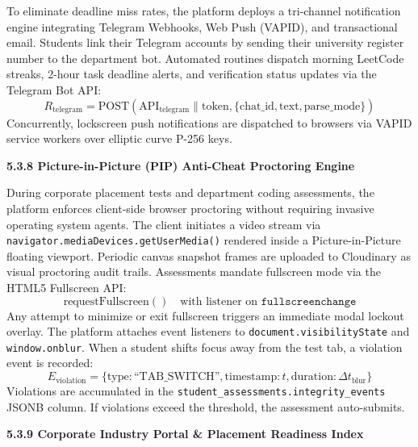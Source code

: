 {To eliminate deadline miss rates, the platform deploys a tri-channel notification engine integrating Telegram Webhooks, Web Push (VAPID), and transactional email.
Students link their Telegram accounts by sending their university register number to the department bot. Automated routines dispatch morning LeetCode streaks, 2-hour task deadline alerts, and verification status updates via the Telegram Bot API:
\begin{equation}
R_{\text{telegram}} = \text{POST}(\text{API}_{\text{telegram}} \parallel \text{token}, \{\text{chat\_id}, \text{text}, \text{parse\_mode}\}) \tag{9}
\end{equation}
Concurrently, lockscreen push notifications are dispatched to browsers via VAPID service workers over elliptic curve P-256 keys.

\vspace{0.4cm}
{\fontsize{13pt}{17pt}\selectfont\bfseries 5.3.8 Picture-in-Picture (PIP) Anti-Cheat Proctoring Engine\par}
\vspace{0.2cm}

During corporate placement tests and department coding assessments, the platform enforces client-side browser proctoring without requiring invasive operating system agents.
The client initiates a video stream via \texttt{navigator.mediaDevices.getUserMedia()} rendered inside a Picture-in-Picture floating viewport. Periodic canvas snapshot frames are uploaded to Cloudinary as visual proctoring audit trails.
Assessments mandate fullscreen mode via the HTML5 Fullscreen API:
\begin{equation}
\text{requestFullscreen}() \quad \text{with listener on } \texttt{fullscreenchange} \tag{10}
\end{equation}
Any attempt to minimize or exit fullscreen triggers an immediate modal lockout overlay. The platform attaches event listeners to \texttt{document.visibilityState} and \texttt{window.onblur}. When a student shifts focus away from the test tab, a violation event is recorded:
\begin{equation}
E_{\text{violation}} = \{\text{type}: \text{``TAB\_SWITCH''}, \text{timestamp}: t, \text{duration}: \Delta t_{\text{blur}}\} \tag{11}
\end{equation}
Violations are accumulated in the \texttt{student\_assessments.integrity\_events} JSONB column. If violations exceed the threshold, the assessment auto-submits.

\vspace{0.4cm}
{\fontsize{13pt}{17pt}\selectfont\bfseries 5.3.9 Corporate Industry Portal \& Placement Readiness Index\par}
\vspace{0.2cm}

}
